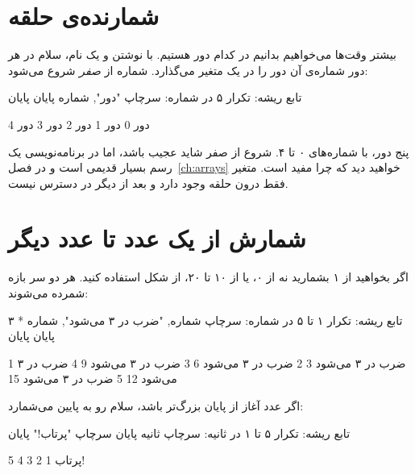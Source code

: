 \section{شمارنده‌ی حلقه}

بیشتر وقت‌ها می‌خواهیم بدانیم در کدام دور هستیم. با نوشتن  و یک
نام، سلام در هر دور شماره‌ی آن دور را در یک متغیر می‌گذارد. شماره از
\emph{صفر} شروع می‌شود:

\begin{salamfa}
تابع ریشه:
    تکرار ۵ در شماره:
        سرچاپ "دور", شماره
    پایان
پایان
\end{salamfa}

\begin{outputfa}
دور 0
دور 1
دور 2
دور 3
دور 4
\end{outputfa}

پنج دور، با شماره‌های ۰ تا ۴. شروع از صفر شاید عجیب باشد، اما در
برنامه‌نویسی یک رسم بسیار قدیمی است و در فصل~\ref{ch:arrays} خواهید دید که
چرا مفید است. متغیر  فقط درون حلقه وجود دارد و بعد از
 دیگر در دسترس نیست.

\section{شمارش از یک عدد تا عدد دیگر}

اگر بخواهید از ۱ بشمارید نه از ۰، یا از ۱۰ تا ۲۰، از شکل  استفاده کنید. هر دو سر بازه شمرده می‌شوند:

\begin{salamfa}
تابع ریشه:
    تکرار ۱ تا ۵ در شماره:
        سرچاپ شماره, "ضرب در ۳ می‌شود", شماره * ۳
    پایان
پایان
\end{salamfa}

\begin{outputfa}
1 ضرب در ۳ می‌شود 3
2 ضرب در ۳ می‌شود 6
3 ضرب در ۳ می‌شود 9
4 ضرب در ۳ می‌شود 12
5 ضرب در ۳ می‌شود 15
\end{outputfa}

اگر عدد آغاز از پایان بزرگ‌تر باشد، سلام رو به پایین می‌شمارد:

\begin{salamfa}
تابع ریشه:
    تکرار ۵ تا ۱ در ثانیه:
        سرچاپ ثانیه
    پایان
    سرچاپ "پرتاب!"
پایان
\end{salamfa}

\begin{outputfa}
5
4
3
2
1
پرتاب!
\end{outputfa}

